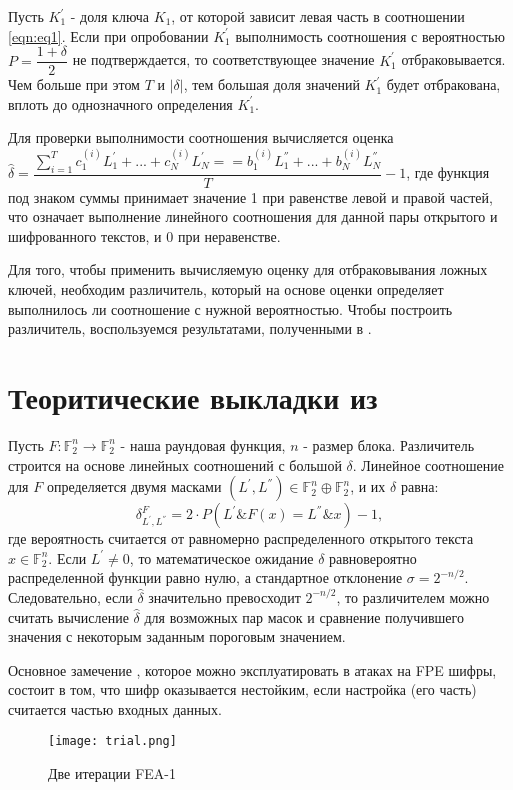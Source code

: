 \documentclass[utf8x, 14pt]{G7-32} %
\begin{document}
Пусть $K_1^{'}$ - доля ключа $K_1$, от которой зависит левая часть в соотношении \ref{eqn:eq1}. Если при опробовании $K_1^{'}$ выполнимость соотношения с вероятностью $P = \dfrac{1+\delta}{2}$ не подтверждается, то соответствующее значение $K_1^{'}$ отбраковывается. Чем больше при этом $T$ и $|\delta|$, тем большая доля значений $K_1^{'}$ будет отбракована, вплоть до однозначного определения $K_1^{'}$.

Для проверки выполнимости соотношения вычисляется оценка $\hat{\delta} = \dfrac{\sum_{i=1}^T c_1^{(i)} L_1^{'} + ... + c_N^{(i)} L_N^{'} == b_1^{(i)} L_1^{''} + ... + b_N^{(i)} L_N^{''}} {T} - 1 $, где функция под знаком суммы принимает значение 1 при равенстве левой и правой частей, что означает выполнение линейного соотношения для данной пары открытого и шифрованного текстов, и 0 при неравенстве.

Для того, чтобы применить вычисляемую оценку для отбраковывания ложных ключей, необходим различитель, который на основе оценки определяет выполнилось ли соотношение с нужной вероятностью. Чтобы построить различитель, воспользуемся результатами, полученными в \cite{main_paper}.


\section{Теоритические выкладки из \cite{main_paper}}
Пусть $F: \mathbb{F}_2^n \to \mathbb{F}_2^n$ - наша раундовая функция, $n$ - размер блока. Различитель строится на основе линейных соотношений с большой $\delta$. Линейное соотношение для $F$ определяется двумя масками $(L^{'}, L^{''}) \in \mathbb{F}_2^n \oplus \mathbb{F}_2^n$, и их $\delta$ равна:
$$ \delta_{L^{'}, L^{''}}^{F} = 2\cdot P\left(L^{'} \& F(x) = L^{''} \& x\right)-1 ,$$
где вероятность считается от равномерно распределенного открытого текста  $x\in \mathbb{F}_2^n$. Если $L^{'} \neq 0$, то математическое ожидание $\delta$ равновероятно распределенной функции равно нулю, а стандартное отклонение $\sigma = 2^{-n/2}$. Следовательно, если $\hat{\delta}$ значительно превосходит $2^{-n/2}$, то различителем можно считать вычисление $\hat{\delta}$ для возможных пар масок и сравнение получившего значения с некоторым заданным пороговым значением.

Основное замечение \cite{main_paper}, которое можно эксплуатировать в атаках на FPE шифры, состоит в том, что шифр оказывается нестойким, если настройка (его часть) считается частью входных данных.

\begin{figure}[h!]
	\centering
	\texttt{[image: trial.png]}
	\caption{Две итерации FEA-1}
	\label{fig:trial}
\end{figure}
\end{document}
